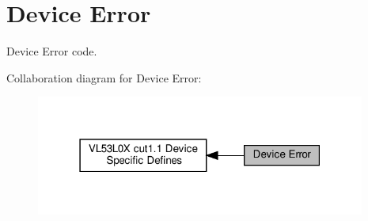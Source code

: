 \hypertarget{group__VL53L0X__DeviceError__group}{}\section{Device Error}
\label{group__VL53L0X__DeviceError__group}


Device Error code.  


Collaboration diagram for Device Error\+:\nopagebreak
\begin{figure}[H]
\begin{center}
\leavevmode
\includegraphics[width=307pt]{group__VL53L0X__DeviceError__group}
\end{center}
\end{figure}
